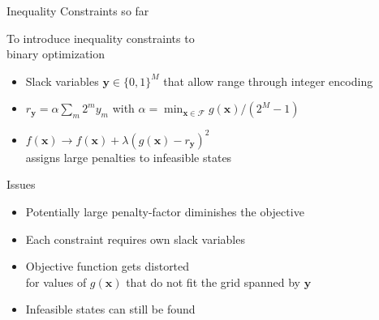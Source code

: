 \documentclass[aspectratio=169]{beamer}
\begin{document}
\begin{frame}{Inequality Constraints so far}
    \begin{minipage}{0.5\textwidth}
        To introduce inequality constraints to\\binary optimization
        \begin{itemize}
            \item Slack variables $\mathbf{y} \in \{0, 1\}^M$ that allow range through integer
                encoding
            \item $r_\mathbf{y} = \alpha \sum_m 2^m y_m$ with $\alpha = \min_{\mathbf{x} \in
                \mathcal{F}} g(\mathbf{x})/(2^M - 1)$
            \item $f(\mathbf{x}) \rightarrow f(\mathbf{x}) + \lambda
                (g(\mathbf{x}) - r_\mathbf{y})^2$\\
                assigns large penalties to infeasible states
        \end{itemize}
    \end{minipage}%
    \begin{minipage}{0.5\textwidth}
        \begin{block}{Issues}
            \vspace{10pt}
            \begin{itemize}
                \item Potentially large penalty-factor diminishes the objective
                \item Each constraint requires own slack variables
                \item Objective function gets distorted\\for values of
                    $g(\mathbf{x})$ that do not fit the grid spanned by
                    $\mathbf{y}$
                \item Infeasible states can still be found
            \end{itemize}
        \end{block}
    \end{minipage}
\end{frame}
\end{document}
